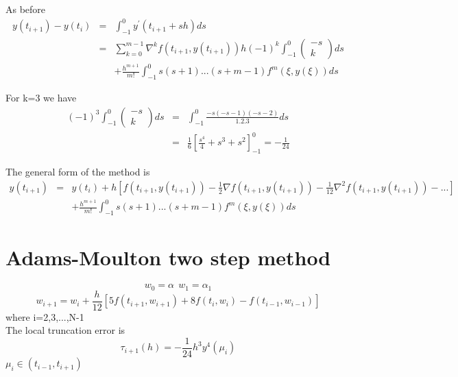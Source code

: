 As before
\begin{eqnarray*}
y(t_{i+1})-y(t_{i}) &=& \int_{-1}^{0} y^{'}(t_{i+1}+sh) ds\\
&=&
\sum_{k=0}^{m-1}\nabla^k  f(t_{i+1},y(t_{i+1}))h(-1)^k\int_{-1}^{0}\left(\begin{array}{c}-s \\ k \end{array}\right)ds\\
& &+\frac{h^{m+1}}{m!}\int_{-1}^{0}s(s+1)...(s+m-1)f^{m}(\xi,y(\xi))ds
\end{eqnarray*}
\begin{example}
For k=3 we have 
\begin{eqnarray*}
(-1)^3\int_{-1}^{0}\left(\begin{array}{c}-s \\ k \end{array}\right)ds
&=& \int_{-1}^{0} \frac{-s(-s-1)(-s-2)}{1.2.3}ds\\
&=& \frac{1}{6} \left[ \frac{s^4}{4}+s^3+s^2\right]^{0}_{-1}=-\frac{1}{24}
\end{eqnarray*}
\end{example}
The general form of the  method is 
\begin{eqnarray*}
y(t_{i+1}) &=&y(t_i)+ h[f(t_{i+1},y(t_{i+1}))-\frac{1}{2}\nabla f(t_{i+1},y(t_{i+1}))-\frac{1}{12}\nabla^2 f(t_{i+1},y(t_{i+1})) - ... ]\\
& & +\frac{h^{m+1}}{m!}\int_{-1}^{0}s(s+1)...(s+m-1)f^{m}(\xi,y(\xi))ds
\end{eqnarray*}

\section*{Adams-Moulton two step method}
\[ w_0=\alpha \ \ w_1=\alpha_1  \]
\[w_{i+1} = w_{i}+\frac{h}{12}[5f(t_{i+1},w_{i+1}) +8 f(t_{i},w_{i})-f(t_{i-1},w_{i-1})] \]
where i=2,3,...,N-1\\
The local truncation error is 
\[\tau_{i+1}(h) =-\frac{1}{24}h^3 y^4(\mu_i)\]
$\mu_i \in (t_{i-1},t_{i+1})$


